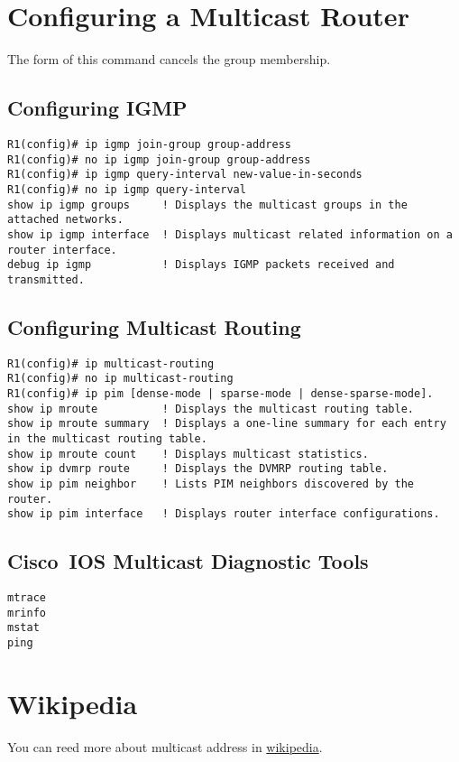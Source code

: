 \documentclass{../UTNetLab}
\begin{document}
\newpage
\begin{appendices}

    \section{Configuring a Multicast Router}
    The  form of this command cancels the group membership.
    \begin{subappendices}
        \subsection{Configuring IGMP}
        \begin{lstlisting}[language={cisco}, emph={group-address, new-value-in-seconds}]
R1(config)# ip igmp join-group group-address
R1(config)# no ip igmp join-group group-address
R1(config)# ip igmp query-interval new-value-in-seconds
R1(config)# no ip igmp query-interval
show ip igmp groups     ! Displays the multicast groups in the attached networks.
show ip igmp interface  ! Displays multicast related information on a router interface.
debug ip igmp           ! Displays IGMP packets received and transmitted.
    \end{lstlisting}

        \subsection{Configuring Multicast Routing}
        \begin{lstlisting}[language={cisco}]
R1(config)# ip multicast-routing
R1(config)# no ip multicast-routing
R1(config)# ip pim [dense-mode | sparse-mode | dense-sparse-mode].
show ip mroute          ! Displays the multicast routing table.
show ip mroute summary  ! Displays a one-line summary for each entry in the multicast routing table.
show ip mroute count    ! Displays multicast statistics.
show ip dvmrp route     ! Displays the DVMRP routing table.
show ip pim neighbor    ! Lists PIM neighbors discovered by the router.
show ip pim interface   ! Displays router interface configurations.
    \end{lstlisting}

        \subsection{Cisco~IOS Multicast Diagnostic Tools}
        \begin{lstlisting}[language={cisco}]
mtrace
mrinfo
mstat
ping
\end{lstlisting}

    \end{subappendices}

    \section{Wikipedia}
    You can reed more about multicast address in \href{https://en.wikipedia.org/wiki/Multicast_address}{wikipedia}.

\end{appendices}
\end{document}
